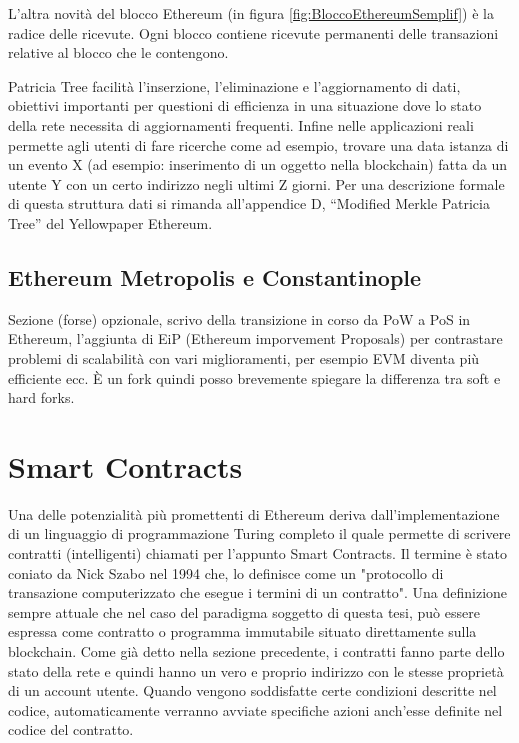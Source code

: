 L’altra novità del blocco Ethereum (in figura \ref{fig:BloccoEthereumSemplif}) è la radice delle ricevute. Ogni blocco contiene ricevute permanenti delle transazioni relative al blocco che le contengono.

Patricia Tree facilità l'inserzione, l'eliminazione e l'aggiornamento di dati, obiettivi importanti per questioni di efficienza in una situazione dove lo stato della rete necessita di aggiornamenti frequenti. Infine nelle applicazioni reali permette agli utenti di fare ricerche come ad esempio, trovare una data istanza di un evento X (ad esempio: inserimento di un oggetto nella blockchain) fatta da un utente Y con un certo indirizzo negli ultimi Z giorni.
Per una descrizione formale di questa struttura dati si rimanda all’appendice D, “Modified Merkle Patricia Tree” del Yellowpaper Ethereum.

\subsection{Ethereum Metropolis e Constantinople}

Sezione (forse) opzionale, scrivo della transizione in corso da PoW a PoS in Ethereum, l'aggiunta di EiP (Ethereum imporvement Proposals) per contrastare problemi di scalabilità con vari miglioramenti, per esempio EVM diventa più efficiente ecc. 
È un fork quindi posso brevemente spiegare la differenza tra soft e hard forks.

\section{Smart Contracts}

Una delle potenzialità più promettenti di Ethereum deriva dall’implementazione di un linguaggio di programmazione Turing completo il quale permette di scrivere contratti (intelligenti) chiamati per l’appunto Smart Contracts. Il termine è stato coniato da Nick Szabo nel 1994 che, lo definisce come un "protocollo di transazione computerizzato che esegue i termini di un contratto". Una definizione sempre attuale che nel caso del paradigma soggetto di questa tesi, può essere espressa come contratto o programma immutabile situato direttamente sulla blockchain. Come già detto nella sezione precedente, i contratti fanno parte dello stato della rete e quindi hanno un vero e proprio indirizzo con le stesse proprietà di un account utente. Quando vengono soddisfatte certe condizioni descritte nel codice, automaticamente verranno avviate specifiche azioni anch'esse definite nel codice del contratto.

